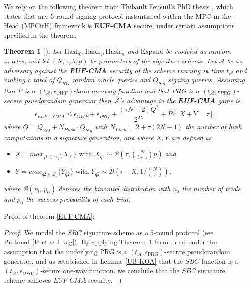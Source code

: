 \documentclass[english]{article}
\newtheorem{theorem}{Theorem}[section]
\begin{document}
	We rely on the following theorem from Thibault Feneuil's PhD thesis \cite{feneu2023}, which states that any 5-round signing protocol instantiated within the MPC-in-the-Head (MPCitH) framework is \textbf{EUF-CMA} secure, under certain assumptions specified in the theorem.
	
	\begin{theorem}[\cite{feneu2023}]\label{theorem_feneu}
		Let $\text{Hash}_0, \text{Hash}_1, \text{Hash}_m$ and $\text{Expand}$ be modeled as random oracles, and let $(N, \tau, \lambda, p)$ be parameters of the signature scheme. Let $\mathcal{A}$ be an adversary against the \textbf{EUF-CMA} security of the scheme running in time $t_{\mathcal{A}}$ and making a total of $Q_{RO}$ random oracle queries and $Q_{Sig}$ signing queries. Assuming that $F$ is a $(t_{\mathcal{A}}, \epsilon_{OWF})$-hard one-way function and that PRG is a $(t_{\mathcal{A}}, \epsilon_{PRG})$-secure psuedorandom generator then $\mathcal{A}$'s advantage in the \textbf{EUF-CMA} game is
		$$
			\epsilon_{EUF-CMA} \leq \epsilon_{OWF} + \epsilon_{PRG} + \frac{(\tau N + 2)Q^2}{2^{2\lambda}} + Pr[X+Y = \tau],
		$$
		where $Q = Q_{RO} + N_{Hash} \cdot Q_{Sig}$ with $N_{Hash} = 2 + \tau(2N - 1)$ the number of hash computations in a signature generation, and where $X, Y$ are defined as
		\begin{itemize}
			\item $X = max_{q1 \in \mathcal{Q}_1} \{X_{q1}\} \text{ with } X_{q1} \sim \mathcal{B}\left(\tau, \binom{N}{l+1}p\right)$ and
			\item $Y = max_{q2 \in \mathcal{Q}_2} \{Y_{q2}\} \text{ with } Y_{q2} \sim \mathcal{B}\left(\tau - X, 1 / \binom{N}{l}\right)$,
		\end{itemize}
		where $\mathcal{B}(n_0, p_0)$ denotes the binomial distribution with $n_0$ the number of trials and $p_0$ the success probability of each trial.
	\end{theorem}
	
	Proof of theorem \ref{EUF-CMA}:
	\begin{proof}
		We model the $SBC$ signature scheme \cite{HJ23} as a 5-round protocol (see Protocol~\ref{Protocol_sig}). By applying Theorem~\ref{theorem_feneu} from \cite{feneu2023}, and under the assumption that the underlying PRG is a $(t_{\mathcal{A}}, \epsilon_{\mathrm{PRG}})$-secure pseudorandom generator, and as established in Lemma~\ref{UB-KOA} that the $SBC$ function is a $(t_{\mathcal{A}}, \epsilon_{\mathrm{OWF}})$-secure one-way function, we conclude that the $SBC$ signature scheme achieves $EUF$-$CMA$ security.
	\end{proof}
\end{document}
